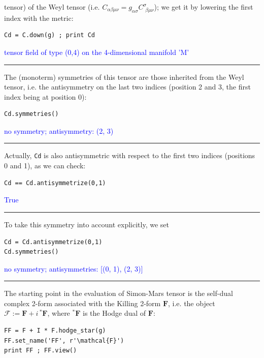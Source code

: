\documentclass[a4paper]{jpconf}
\newcommand{\code}[1]{\texttt{#1}}
\newcommand{\w}[1]{\bm{#1}}
\newcommand{\soutput}[1]{\textcolor{blue}{#1}\\[-0.8ex]\rule{\textwidth}{0.4pt}}
\begin{document}
tensor) of the Weyl tensor (i.e. $C_{\alpha\beta\mu\nu} = g_{\alpha\sigma} C^\sigma_{\ \, \beta\mu\nu}$); we get it by lowering the first index with the metric:
\begin{verbatim}
Cd = C.down(g) ; print Cd
\end{verbatim}
\soutput{tensor field of type (0,4) on the 4-dimensional manifold 'M'}
The (monoterm) symmetries of this tensor are those inherited from the
Weyl tensor, i.e. the antisymmetry on the last two indices (position 2 and 3, the first index being at position 0):
\begin{verbatim}
Cd.symmetries()
\end{verbatim}
\soutput{no symmetry;  antisymmetry: (2, 3)}
Actually, \code{Cd} is also antisymmetric with respect to the first two indices (positions 0 and 1), as we can check:
\begin{verbatim}
Cd == Cd.antisymmetrize(0,1)
\end{verbatim}
\soutput{True}
To take this symmetry into account explicitly, we set
\begin{verbatim}
Cd = Cd.antisymmetrize(0,1)
Cd.symmetries()
\end{verbatim}
\soutput{no symmetry;  antisymmetries: [(0, 1), (2, 3)]}
The starting point in the evaluation of Simon-Mars tensor is the
self-dual complex 2-form associated with the Killing 2-form $\w{F}$, i.e. the object
$\w{\mathcal{F}} := \w{F} + i \, {}^* \w{F}$, where ${}^*\w{F}$ is the Hodge dual of $\w{F}$:
\begin{verbatim}
FF = F + I * F.hodge_star(g)
FF.set_name('FF', r'\mathcal{F}')
print FF ; FF.view()
\end{verbatim}
\end{document}
